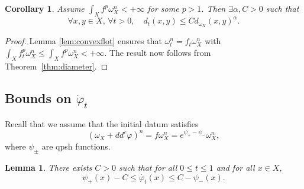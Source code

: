 \documentclass[a4paper,11pt,leqno,english]{smfart}
\theoremstyle{plain}
\theoremstyle{plain}
\numberwithin{equation}{section} %
\numberwithin{figure}{section} %
\newtheorem{cor}[thm]{Corollary} %
\theoremstyle{plain}
\theoremstyle{plain}
\newtheorem{lem}[thm]{Lemma} %
\theoremstyle{remark}
\theoremstyle{remark}
\theoremstyle{definition}
\theoremstyle{plain}
\theoremstyle{plain}
\theoremstyle{definition}
\newcommand{\f}{\varphi}
\newcommand{\p}{\psi}
\begin{document}
\begin{cor} \label{cor:equicont1}
Assume $\int_X f^p  \omega_X^n <+\infty$ for some $p>1$. 
Then $\exists \alpha, C>0$ such that
\[ \forall  x,y \in X, \,\forall t>0, \quad d_{t} (x,y) \leq C d_{\omega_X}(x,y)^{\alpha}.\]
\end{cor}
   
   \begin{proof}
   Lemma \ref{lem:convexflot} ensures that $\omega_t^n=f_t \omega_X^n$ with
   $\int_X f_t^p \omega_X^n \leq \int_X f^p \omega_X^n <+\infty$.
   The result now follows from Theorem~\ref{thm:diameter}.
   \end{proof}
   
   
   
   
  
  \subsection{Bounds on $\dot{\f}_t$}

 Recall that we assume that the initial datum satisfies
$$
(\omega_X+dd^c \f)^n=f \omega_X^n =e^{\p_+-\p_-} \omega_X^n,
$$
where $\p_{\pm}$ are qpsh functions.
 

\begin{lem} \label{lem:bddphidot}
There exists $C>0$ such that for all $0 \leq t \leq 1$ and for all $x \in X$,
$$
 {\p_+}(x) -C   \leq   \dot{\f_t}(x) \leq C-{\p_-}(x) .
$$
\end{lem}
\end{document}
